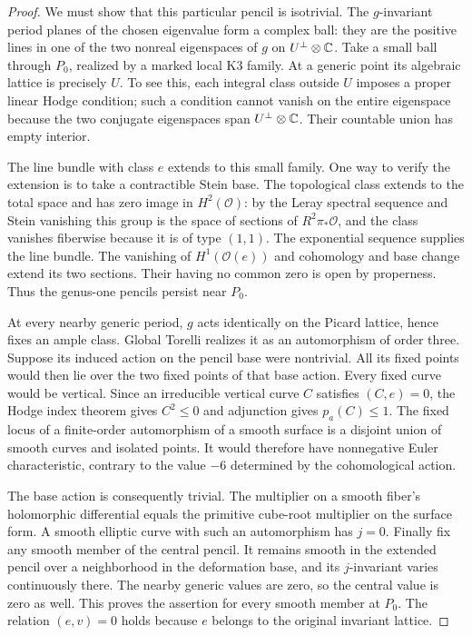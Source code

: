 \begin{proof}
We must show that this particular pencil is isotrivial. The
$g$-invariant period planes of the chosen eigenvalue form a complex
ball: they are the positive lines in one of the two nonreal
eigenspaces of $g$ on $U^\perp\otimes\mathbb C$. Take a small ball through
$P_0$, realized by a marked local K3 family. At a generic point its
algebraic lattice is precisely $U$. To see this, each integral class
outside $U$ imposes a proper linear Hodge condition; such a condition
cannot vanish on the entire eigenspace because the two conjugate
eigenspaces span $U^\perp\otimes\mathbb C$. Their countable union has empty
interior.

The line bundle with class $e$ extends to this small family. One way
to verify the extension is to take a contractible Stein base. The
topological class extends to the total space and has zero image in
$H^2(\mathcal O)$: by the Leray spectral sequence and Stein
vanishing this group is the space of sections of
$R^2\pi_*\mathcal O$, and the class vanishes fiberwise because it is
of type $(1,1)$. The exponential sequence supplies the line bundle.
The vanishing of $H^1(\mathcal O(e))$ and cohomology and base change
extend its two sections. Their having no common zero is open by
properness. Thus the genus-one pencils persist near $P_0$.

At every nearby generic period, $g$ acts identically on the Picard
lattice, hence fixes an ample class. Global Torelli realizes it as
an automorphism of order three. Suppose its induced action on the
pencil base were nontrivial. All its fixed points would then lie
over the two fixed points of that base action. Every fixed curve
would be vertical. Since an irreducible vertical curve $C$ satisfies
$(C,e)=0$, the Hodge index theorem gives $C^2\leq0$ and adjunction
gives $p_a(C)\leq1$. The fixed locus of a finite-order automorphism
of a smooth surface is a disjoint union of smooth curves and
isolated points. It would therefore have nonnegative Euler
characteristic, contrary to the value $-6$ determined by the
cohomological action.

The base action is consequently trivial. The multiplier on a
smooth fiber's holomorphic differential equals the primitive
cube-root multiplier on the surface form. A smooth elliptic curve
with such an automorphism has $j=0$. Finally fix any smooth member
of the central pencil. It remains smooth in the extended pencil
over a neighborhood in the deformation base, and its $j$-invariant
varies continuously there. The nearby generic values are zero, so
the central value is zero as well. This proves the assertion for
every smooth member at $P_0$. The relation $(e,v)=0$ holds because
$e$ belongs to the original invariant lattice.
\end{proof}

